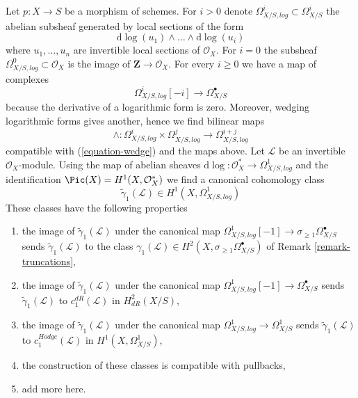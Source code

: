 \begin{remark}
\label{remark-log-forms}
Let $p : X \to S$ be a morphism of schemes. For $i > 0$
denote $\Omega^i_{X/S, log} \subset \Omega^i_{X/S}$ the abelian subsheaf
generated by local sections of the form
$$
\text{d}\log(u_1) \wedge \ldots \wedge \text{d}\log(u_i)
$$
where $u_1, \ldots, u_n$ are invertible local sections of $\mathcal{O}_X$.
For $i = 0$ the subsheaf $\Omega^0_{X/S, log} \subset \mathcal{O}_X$
is the image of $\mathbf{Z} \to \mathcal{O}_X$. For every $i \geq 0$ we
have a map of complexes
$$
\Omega^i_{X/S, log}[-i] \longrightarrow \Omega^\bullet_{X/S}
$$
because the derivative of a logarithmic form is zero. Moreover, wedging
logarithmic forms gives another, hence we find bilinear maps
$$
\wedge :  \Omega^i_{X/S, log} \times
\Omega^j_{X/S, log} \longrightarrow \Omega^{i + j}_{X/S, log}
$$
compatible with (\ref{equation-wedge}) and the maps above.
Let $\mathcal{L}$ be an invertible $\mathcal{O}_X$-module.
Using the map of abelian sheaves
$\text{d}\log : \mathcal{O}_X^* \to \Omega^1_{X/S, log}$
and the identification $\Pic(X) = H^1(X, \mathcal{O}_X^*)$
we find a canonical cohomology class
$$
\tilde \gamma_1(\mathcal{L}) \in H^1(X, \Omega^1_{X/S, log})
$$
These classes have the following properties
\begin{enumerate}
\item the image of $\tilde \gamma_1(\mathcal{L})$ under the canonical
map $\Omega^1_{X/S, log}[-1] \to \sigma_{\geq 1}\Omega^\bullet_{X/S}$
sends $\tilde \gamma_1(\mathcal{L})$ to the class
$\gamma_1(\mathcal{L}) \in 
H^2(X, \sigma_{\geq 1}\Omega^\bullet_{X/S})$
of Remark \ref{remark-truncations},
\item the image of $\tilde \gamma_1(\mathcal{L})$ under the canonical
map $\Omega^1_{X/S, log}[-1] \to \Omega^\bullet_{X/S}$
sends $\tilde \gamma_1(\mathcal{L})$ to $c_1^{dR}(\mathcal{L})$ in
$H^2_{dR}(X/S)$,
\item the image of $\tilde \gamma_1(\mathcal{L})$ under the canonical
map $\Omega^1_{X/S, log} \to \Omega^1_{X/S}$
sends $\tilde \gamma_1(\mathcal{L})$ to $c_1^{Hodge}(\mathcal{L})$ in
$H^1(X, \Omega^1_{X/S})$,
\item the construction of these classes is compatible with pullbacks,
\item add more here.
\end{enumerate}
\end{remark}













